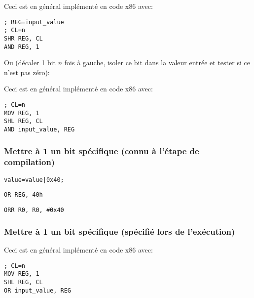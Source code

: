 

Ceci est en général implémenté en code x86 avec:

\begin{lstlisting}[caption=x86,style=customasmx86]
; REG=input_value
; CL=n
SHR REG, CL
AND REG, 1
\end{lstlisting}

Ou (décaler 1 bit $n$ fois à gauche, isoler ce bit dans la valeur entrée et tester
si ce n'est pas zéro):



Ceci est en général implémenté en code x86 avec:

\begin{lstlisting}[caption=x86,style=customasmx86]
; CL=n
MOV REG, 1
SHL REG, CL
AND input_value, REG
\end{lstlisting}

\subsubsection{Mettre à 1 un bit spécifique (connu à l'étape de compilation)}

\begin{lstlisting}[caption=\CCpp]
value=value|0x40;
\end{lstlisting}

\begin{lstlisting}[caption=x86,style=customasmx86]
OR REG, 40h
\end{lstlisting}

\begin{lstlisting}[caption=ARM (\ARMMode) and ARM64,style=customasmARM]
ORR R0, R0, #0x40
\end{lstlisting}

\subsubsection{Mettre à 1 un bit spécifique (spécifié lors de l'exécution)}



Ceci est en général implémenté en code x86 avec:

\begin{lstlisting}[caption=x86,style=customasmx86]
; CL=n
MOV REG, 1
SHL REG, CL
OR input_value, REG
\end{lstlisting}

